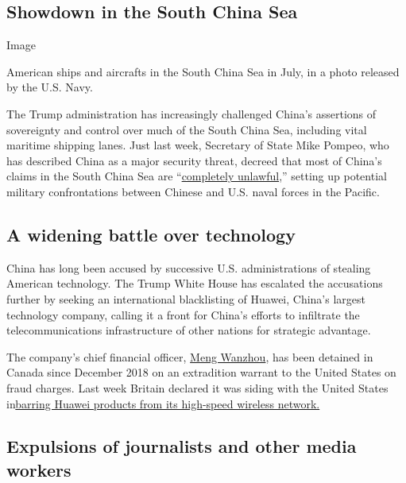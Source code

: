 \hypertarget{showdown-in-the-south-china-sea}{%
\subsection{Showdown in the South China
Sea}\label{showdown-in-the-south-china-sea}}

Image

American ships and aircrafts in the South China Sea in July, in a photo
released by the U.S. Navy.

The Trump administration has increasingly challenged China's assertions
of sovereignty and control over much of the South China Sea, including
vital maritime shipping lanes. Just last week, Secretary of State Mike
Pompeo, who has described China as a major security threat, decreed that
most of China's claims in the South China Sea are
``\href{https://www.nytimes3xbfgragh.onion/2020/07/13/world/asia/south-china-sea-pompeo.html?searchResultPosition=2}{completely
unlawful},'' setting up potential military confrontations between
Chinese and U.S. naval forces in the Pacific.

\hypertarget{a-widening-battle-over-technology}{%
\subsection{A widening battle over
technology}\label{a-widening-battle-over-technology}}

China has long been accused by successive U.S. administrations of
stealing American technology. The Trump White House has escalated the
accusations further by seeking an international blacklisting of Huawei,
China's largest technology company, calling it a front for China's
efforts to infiltrate the telecommunications infrastructure of other
nations for strategic advantage.

The company's chief financial officer,
\href{https://www.nytimes3xbfgragh.onion/2020/05/27/world/canada/huawei-extradition-meng-wanzhou.html?searchResultPosition=2}{Meng
Wanzhou}, has been detained in Canada since December 2018 on an
extradition warrant to the United States on fraud charges. Last week
Britain declared it was siding with the United States
in\href{https://www.nytimes3xbfgragh.onion/2020/07/14/business/huawei-uk-5g.html?searchResultPosition=1}{barring
Huawei products from its high-speed wireless network.}

\hypertarget{expulsions-of-journalists-and-other-media-workers}{%
\subsection{Expulsions of journalists and other media
workers}\label{expulsions-of-journalists-and-other-media-workers}}

